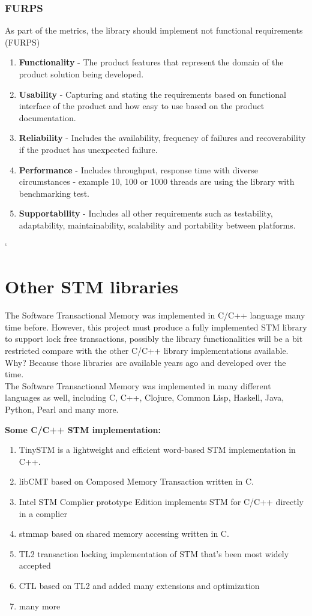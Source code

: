 \documentclass[12pt]{article}
\begin{document}
\subsubsection{FURPS}
As part of the metrics, the library should implement not functional requirements (FURPS)\cite{PPTX}
\begin{enumerate}
\item \textbf{Functionality} - The product features that represent the domain of the product solution being developed. 
\item \textbf{Usability} - Capturing and stating the requirements based on functional interface of the product and how easy to use based on the product documentation. 
\item \textbf{Reliability} -  Includes the availability, frequency of failures and recoverability if the product has unexpected failure.
\item \textbf{Performance} - Includes throughput, response time with diverse circumstances - example 10, 100 or 1000 threads are using the library with benchmarking test.
\item \textbf{Supportability} - Includes all other requirements such as 
testability, adaptability, maintainability, scalability and portability between platforms. 
\end{enumerate}

`
\section{Other STM libraries}
The Software Transactional Memory was implemented in C/C++ language many time before. However, this project must produce a fully implemented STM library to support lock free transactions, possibly the library functionalities will be a bit restricted compare with the other C/C++ library implementations available. Why? Because those libraries are available years ago and developed over the time.\\

The Software Transactional Memory was implemented in many different languages as well, including C, C++, Clojure, Common Lisp, Haskell, Java, Python, Pearl and many more.

\textbf{Some C/C++ STM implementation:} 
\begin{enumerate}
\item TinySTM is a lightweight and efficient word-based STM implementation in C++.
\item libCMT based on Composed Memory Transaction written in C.
\item Intel STM Complier prototype Edition implements STM for C/C++ directly in a complier
\item stmmap based on shared memory accessing written in C.
\item TL2 transaction locking implementation of STM that’s been most widely accepted
\item CTL based on TL2 and added many extensions and optimization
\item many more
\end{enumerate}
\end{document}
